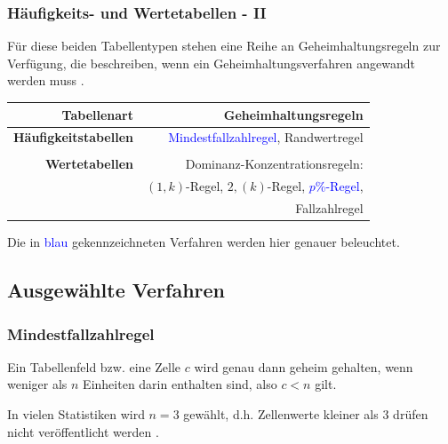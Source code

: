 \documentclass[aspectratio=169]{beamer}
\begin{document}
\begin{frame}
    \frametitle{Häufigkeits- und Wertetabellen - II}
    Für diese beiden Tabellentypen stehen eine Reihe an Geheimhaltungsregeln zur Verfügung, die beschreiben, wenn ein Geheimhaltungsverfahren angewandt werden muss \cite{Nickl}.
    \begin{center}
        \begin{tabular}{ r r }
         \textbf{Tabellenart} \vline & \textbf{Geheimhaltungsregeln} \\ 
         \hline
         \textbf{Häufigkeitstabellen} \vline & \textcolor{blue}{Mindestfallzahlregel}, Randwertregel \\  
         \vline & \\
         \hline
         \textbf{Wertetabellen} \vline & Dominanz-Konzentrationsregeln:  \\
         \vline & $(1,k)$-Regel, $2,(k)$-Regel, \textcolor{blue}{$p$\%-Regel}, \\
         \vline & Fallzahlregel
        \end{tabular}
    \end{center}
    Die in \textcolor{blue}{blau} gekennzeichneten Verfahren werden hier genauer beleuchtet.
\end{frame}


\subsection{Ausgewählte Verfahren}

\begin{frame}
    \frametitle{Mindestfallzahlregel}
    \begin{theorem}[Mindestfallzahlregel]
        Ein Tabellenfeld bzw. eine Zelle $c$ wird genau dann geheim gehalten, wenn weniger als $n$ Einheiten darin enthalten sind, also $c < n$ gilt.
    \end{theorem}
    In vielen Statistiken wird $n = 3$ gewählt, d.h. Zellenwerte kleiner als $3$ drüfen nicht veröffentlicht werden \cite{Nickl}.
\end{frame}
\end{document}

